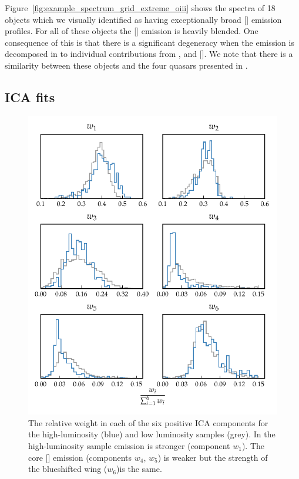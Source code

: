 Figure~\ref{fig:example_spectrum_grid_extreme_oiii} shows the spectra of 18 objects which we visually identified as having exceptionally broad [] emission profiles. 
For all of these objects the [] emission is heavily blended. 
One consequence of this is that there is a significant degeneracy when the emission is decomposed in to individual contributions from , \hb and []. 
We note that there is a similarity between these objects and the four quasars presented in \citet{zakamska16}. 

\subsection{\ac{ICA} fits}

\begin{figure}
    \includegraphics[width=\textwidth]{figures/chapter04/mfica_component_weights.pdf} 
    \caption{The relative weight in each of the six positive \ac{ICA} components for the high-luminosity (blue) and low luminosity samples (grey). In the high-luminosity sample  emission is stronger (component $w_1$). The core [] emission (components $w_4$, $w_5$) is weaker but the strength of the blueshifted wing ($w_6$)is the same.}     
    \label{fig:mfica_component_weights}
\end{figure}

